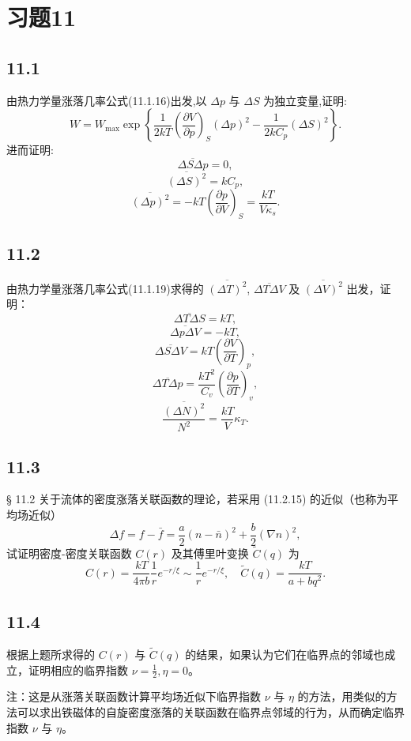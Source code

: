 \section{习题11}

\newpage
\subsection{11.1}
由热力学量涨落几率公式(11.1.16)出发,以 $\Delta p$ 与 $\Delta S$ 为独立变量,证明:
$$W = W_{\text{max}} \exp \left\{ \frac{1}{2kT} \left( \frac{\partial V}{\partial p} \right)_S (\Delta p)^2 - \frac{1}{2kC_p} (\Delta S)^2 \right\}.$$
进而证明:
$$\overline{\Delta S \Delta p} = 0,$$
$$\overline{(\Delta S)^2} = kC_p,$$
$$\overline{(\Delta p)^2} = -kT \left( \frac{\partial p}{\partial V} \right)_S = \frac{kT}{V\kappa_s}.$$

\newpage
\subsection{11.2}
由热力学量涨落几率公式(11.1.19)求得的 $\overline{(\Delta T)^2}$, $\overline{\Delta T \Delta V}$ 及 $\overline{(\Delta V)^2}$ 出发，证明：
$$\overline{\Delta T \Delta S} = kT,$$
$$\overline{\Delta p \Delta V} = -kT,$$
$$\overline{\Delta S \Delta V} = kT \left( \frac{\partial V}{\partial T} \right)_p,$$
$$\overline{\Delta T \Delta p} = \frac{kT^2}{C_v} \left( \frac{\partial p}{\partial T} \right)_v,$$
$$\frac{\overline{(\Delta N)^2}}{N^2} = \frac{kT}{V}\kappa_T.$$

\newpage
\subsection{11.3}
§ 11.2 关于流体的密度涨落关联函数的理论，若采用 (11.2.15) 的近似（也称为平均场近似）
$$\Delta f = f - \bar{f} = \frac{a}{2} (n - \bar{n})^2 + \frac{b}{2} (\nabla n)^2,$$
试证明密度-密度关联函数 $C(r)$ 及其傅里叶变换 $\tilde{C}(q)$ 为
$$C(r) = \frac{kT}{4\pi b} \frac{1}{r} e^{-r/\xi} \sim \frac{1}{r} e^{-r/\xi}, \quad \tilde{C}(q) = \frac{kT}{a + bq^2}.$$

\newpage
\subsection{11.4}
根据上题所求得的 $C(r)$ 与 $\tilde{C}(q)$ 的结果，如果认为它们在临界点的邻域也成立，证明相应的临界指数 $\nu = \frac{1}{2}, \eta = 0$。

注：这是从涨落关联函数计算平均场近似下临界指数 $\nu$ 与 $\eta$ 的方法，用类似的方法可以求出铁磁体的自旋密度涨落的关联函数在临界点邻域的行为，从而确定临界指数 $\nu$ 与 $\eta$。

